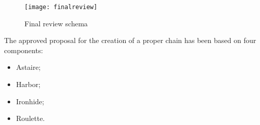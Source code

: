 \begin{figure}[t]
  \centering
  \texttt{[image: finalreview]}
  \caption{Final review schema}
  \label{chap:impl:img:finalreview}
\end{figure}

The approved proposal for the creation of a proper chain has been based on four components:
\begin{itemize}
\item Astaire;
\item Harbor;
\item Ironhide;
\item Roulette.
\end{itemize}
